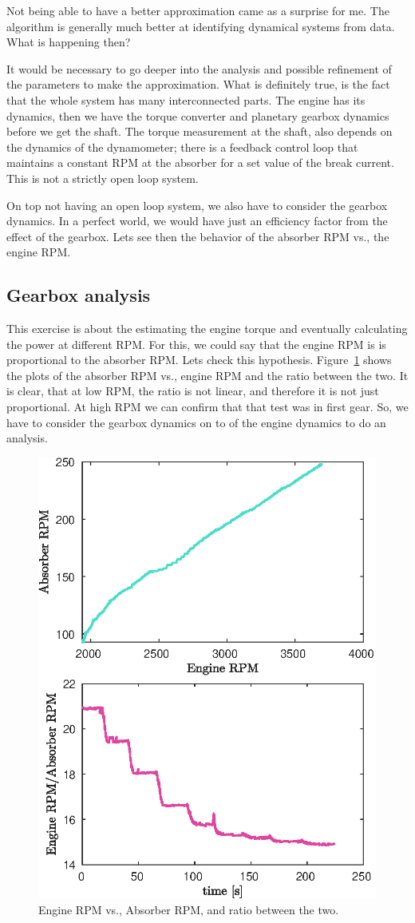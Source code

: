 \documentclass{article}
\begin{document}
Not being able to have a better approximation came as a surprise for me. The algorithm is generally much better at identifying dynamical systems from data. What is happening then? 

It would be necessary to go deeper into the analysis and possible refinement of the parameters to make the approximation. What is definitely true, is the fact that the whole system has many interconnected parts. The engine has its dynamics, then we have the torque converter and planetary gearbox dynamics before we get the shaft. The torque measurement at the shaft, also depends on the dynamics of the dynamometer; there is a feedback control loop that maintains a constant RPM at the absorber for a set value of the break current. This is not a strictly open loop system. 

On top not having an open loop system, we also have to consider the gearbox dynamics. In a perfect world, we would have just an efficiency factor from the effect of the gearbox. Lets see then the behavior of the absorber RPM vs., the engine RPM. 
\subsection{Gearbox analysis}\label{sub:Gearbox analysis} %
This exercise is about the estimating the engine torque and eventually calculating the power at different RPM. For this, we could say that the engine RPM is is proportional to the absorber RPM. Lets check this hypothesis. Figure~\ref{fig:RPMs} shows the plots of the absorber RPM vs., engine RPM and the ratio between the two. It is clear, that at low RPM, the ratio is not linear, and therefore it is not just proportional. At high RPM we can confirm that that test was in first gear. So, we have to consider the gearbox dynamics on to of the engine dynamics to do an analysis. 

\begin{figure}[ht]
\centering
\includegraphics[width=0.7\linewidth]{./figures/ratio_fig.eps}
\caption{Engine RPM vs., Absorber RPM, and ratio between the two.}
\label{fig:RPMs}
\end{figure}
\end{document}
